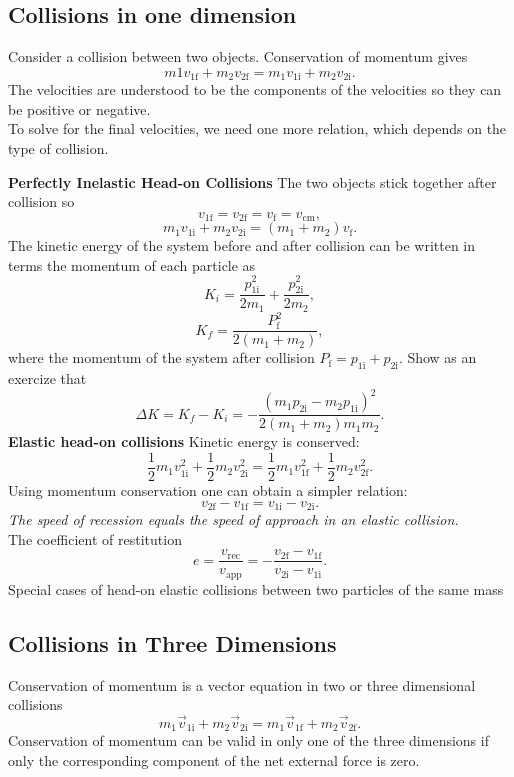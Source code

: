 \documentclass[11pt,a4paper]{report}
\begin{document}
\subsection{Collisions in one dimension}
Consider a collision between two objects. Conservation of momentum gives $$m1 v_{1\mathrm{f}} + m_2 v_{2\mathrm{f}} = m_1 v_{1\mathrm{i}} + m_2 v_{2\mathrm{i}}.$$
The velocities are understood to be the components of the velocities so they can be positive or negative.
\\To solve for the final velocities, we need one more relation, which depends on the type of collision.

\medskip

\noindent
\textbf{Perfectly Inelastic Head-on Collisions} The two objects stick together after collision so $$v_{1\mathrm{f}} = v_{2\mathrm{f}} = v_\mathrm{f} = v_\mathrm{cm},$$ $$m_1 v_{1\mathrm{i}} + m_2 v_{2\mathrm{i}} = \left(m_1 + m_2\right) v_\mathrm{f}.$$
The kinetic energy of the system before and after collision can be written in terms the momentum of each particle as $$K_i = \frac{p_{1\mathrm{i}}^2}{2m_1} + \frac{p_{2\mathrm{i}}^2}{2m_2},$$ $$K_f = \frac{P_\mathrm{f}^2}{2\left(m_1 + m_2\right)},$$ where the momentum of the system after collision $P_\mathrm{f} = p_{1\mathrm{i}} + p_{2\mathrm{i}}$. Show as an exercize that $$\Delta{K} = K_f - K_i = -\frac{\left(m_1 p_{2\mathrm{i}} - m_2 p_{1\mathrm{i}}\right)^2}{2\left(m_1 + m_2\right) m_1 m_2}.$$
\textbf{Elastic head-on collisions} Kinetic energy is conserved: $$\frac{1}{2} m_1 v_{1\mathrm{i}}^2 + \frac{1}{2} m_2 v_{2\mathrm{i}}^2 = \frac{1}{2} m_1 v_{1\mathrm{f}}^2 + \frac{1}{2} m_2 v_{2\mathrm{f}}^2.$$
Using momentum conservation one can obtain a simpler relation: $$v_{2\mathrm{f}} - v_{1\mathrm{f}} = v_{1\mathrm{i}} - v_{2\mathrm{i}}.$$
\textit{The speed of recession equals the speed of approach in an elastic collision.}
\\The coefficient of restitution $$e = \frac{v_\mathrm{rec}}{v_\mathrm{app}} = -\frac{v_{2\mathrm{f}} - v_{1\mathrm{f}}}{v_{2\mathrm{i}} - v_{1\mathrm{i}}}.$$
Special cases of head-on elastic collisions between two particles of the same mass

\subsection{Collisions in Three Dimensions}
Conservation of momentum is a vector equation in two or three dimensional collisions $$m_1 \vec{v}_{1\mathrm{i}} + m_2 \vec{v}_{2\mathrm{i}} = m_1 \vec{v}_{1\mathrm{f}} + m_2 \vec{v}_{2\mathrm{f}}.$$
Conservation of momentum can be valid in only one of the three dimensions if only the corresponding component of the net external force is zero.
\end{document}
